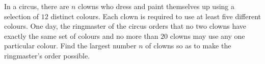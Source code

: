 In a circus, there are $n$ clowns who dress and paint themselves up using a selection of $12$ distinct colours. Each clown is required to use at least five different colours. One day, the ringmaster of the circus orders that no two clowns have exactly the same set of colours and no more than $20$ clowns may use any one particular colour. Find the largest number $n$ of clowns so as to make the ringmaster's order possible.